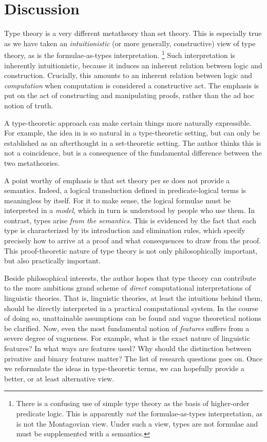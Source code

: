 \documentclass[11pt]{article}
\theoremstyle{definition}
\theoremstyle{plain}
\begin{document}
\section{Discussion}
Type theory is a very different metatheory than set theory.  This is
especially true as we have taken an \emph{intuitionistic} (or more
generally, constructive) view of type theory, as is the
formulae-as-types interpretation.%
\footnote{There is a confusing use of  simple type
  theory as the basis of higher-order predicate logic.  This is
  apparently \emph{not} the formulae-as-types interpretation, as is
  not the Montagovian view.  Under such a view, types are not formulae
  and must be supplemented with a semantics.}
%
Such interpretation is inherently intuitionistic, because it induces
an inherent relation between logic and construction.  Crucially, this
amounts to an inherent relation between logic and \emph{computation}
when computation is considered a constructive act.  The emphasis is
put on the act of constructing and manipulating proofs, rather than
the ad hoc notion of truth.

A type-theoretic approach can make certain things more naturally
expressible.  For example, the idea in  is so
natural in a type-theoretic setting, but can only be established as an
afterthought in a set-theoretic setting.  The author thinks this is
not a coincidence, but is a consequence of the fundamental difference
between the two metatheories.

A point worthy of emphasis is that set theory per se does not provide
a semantics.  Indeed, a logical transduction defined in
predicate-logical terms is meaningless by itself.  For it to make
sense, the logical formulae must be interpreted in a \emph{model},
which in turn is understood by people who use them.  In contrast,
types arise \emph{from the semantics}.  This is evidenced by the fact
that each type is characterized by its introduction and elimination
rules, which specify precisely how to arrive at a proof and what
consequences to draw from the proof.  This proof-theoretic nature of
type theory is not only philosophically important, but also
practically important.

Beside philosophical interests, the author hopes that type theory can
contribute to the more ambitious grand scheme of \emph{direct}
computational interpretations of linguistic theories.  That is,
linguistic theories, at least the intuitions behind them, should be
directly interpreted in a practical computational system.  In the
course of doing so, unattainable assumptions can be found and vague
theoretical notions be clarified.  Now, even the most fundamental
notion of \emph{features} suffers from a severe degree of vagueness.
For example, what is the exact nature of linguistic features?  In what
ways are features used?  Why should the distinction between privative
and binary features matter?  The list of research questions goes on.
Once we reformulate the ideas in type-theoretic terms, we can
hopefully provide a better, or at least alternative view.
\end{document}
